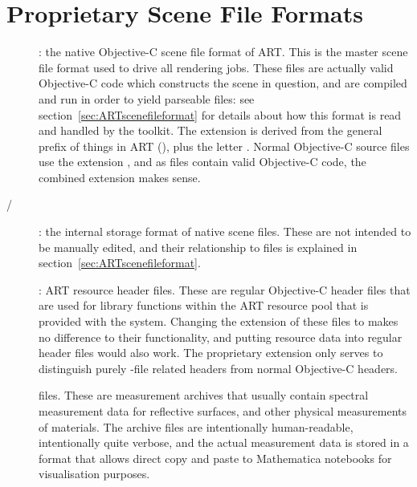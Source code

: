\section{Proprietary Scene File Formats}

\begin{description}
\item[]: the native Objective-C scene file format of ART. This is the master scene file format used to drive all rendering jobs. These files are actually valid Objective-C code which constructs the scene in question, and are compiled and run in order to yield parseable  files: see section~\ref{sec:ARTscenefileformat} for details about how this format is read and handled by the toolkit. The extension  is derived from the general prefix of things in ART (), plus the letter . Normal Objective-C source files use the extension , and as  files contain valid Objective-C code, the combined extension makes sense.

\item[ / ]: the internal storage format of native scene files. These are not intended to be manually edited, and their relationship to  files is explained in section~\ref{sec:ARTscenefileformat}.

\item[]: ART resource header files. These are regular Objective-C header files that are used for library functions within the ART resource pool that is provided with the system. Changing the extension of these files to  makes no difference to their functionality, and putting resource data into regular header files would also work. The proprietary extension only serves to distinguish purely -file related headers from normal Objective-C headers.

\item[] files. These are measurement archives that usually contain spectral measurement data for reflective surfaces, and other physical measurements of materials. The archive files are intentionally human-readable, intentionally quite verbose, and the actual measurement data is stored in a format that allows direct copy and paste to Mathematica notebooks for visualisation purposes.

\end{description}

\label{sect:propsceneformats}
